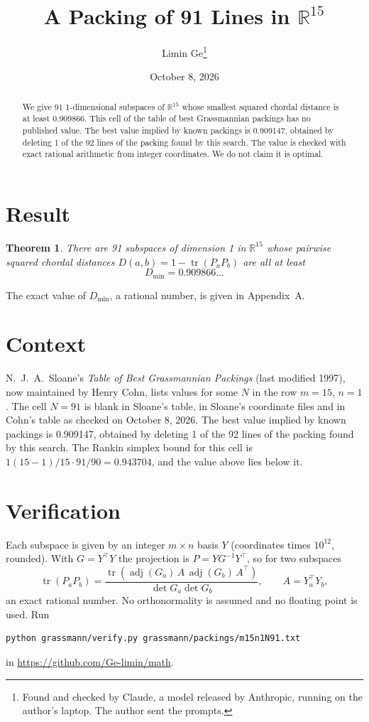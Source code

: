 \documentclass[11pt,a4paper]{article}
\title{A Packing of 91 Lines in $\mathbb{R}^{15}$}
\author{Limin Ge\thanks{Found and checked by Claude, a model released by Anthropic, running on the author's laptop. The author sent the prompts.}}
\date{October 8, 2026}
\newtheorem*{theorem}{Theorem}
\begin{document}
\maketitle
\begin{abstract}
We give 91 1-dimensional subspaces of $\mathbb{R}^{15}$ whose smallest squared chordal distance is at least 0.909866. This cell of the table of best Grassmannian packings has no published value. The best value implied by known packings is 0.909147, obtained by deleting 1 of the 92 lines of the packing found by this search. The value is checked with exact rational arithmetic from integer coordinates. We do not claim it is optimal.
\end{abstract}

\section{Result}
\begin{theorem}
There are 91 subspaces of dimension 1 in $\mathbb{R}^{15}$ whose pairwise squared chordal distances $D(a,b) = 1 - \operatorname{tr}(P_aP_b)$ are all at least
\[ D_{\min} = 0.909866\ldots \]
\end{theorem}
The exact value of $D_{\min}$, a rational number, is given in Appendix~A.


\section{Context}
N.~J.~A.~Sloane's \emph{Table of Best Grassmannian Packings} (last modified 1997), now maintained by Henry Cohn, lists values for some $N$ in the row $m=15$, $n=1$. The cell $N=91$ is blank in Sloane's table, in Sloane's coordinate files and in Cohn's table as checked on October 8, 2026. The best value implied by known packings is 0.909147, obtained by deleting 1 of the 92 lines of the packing found by this search. The Rankin simplex bound for this cell is $1(15-1)/15\cdot 91/90 = 0.943704$, and the value above lies below it.


\section{Verification}
Each subspace is given by an integer $m\times n$ basis $Y$ (coordinates times $10^{12}$, rounded). With $G=Y^\top Y$ the projection is $P=YG^{-1}Y^\top$, so for two subspaces
\[ \operatorname{tr}(P_aP_b)=\frac{\operatorname{tr}(\operatorname{adj}(G_a)\,A\,\operatorname{adj}(G_b)\,A^\top)}{\det G_a\det G_b},\qquad A=Y_a^\top Y_b, \]
an exact rational number. No orthonormality is assumed and no floating point is used. Run
\begin{verbatim}
python grassmann/verify.py grassmann/packings/m15n1N91.txt
\end{verbatim}
in \url{https://github.com/Ge-limin/math}.
\end{document}
